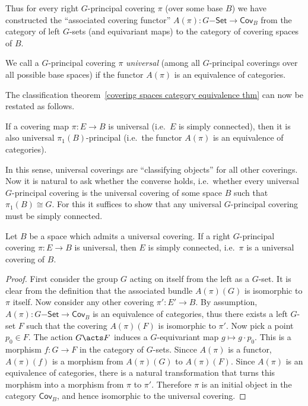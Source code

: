 Thus for every right $G$-principal covering $\pi$ (over some base $B$) we have constructed the ``associated covering functor'' $A(\pi):G\mathsf{-Set}\to \mathsf{Cov}_B$ from the category of left $G$-sets (and equivariant maps) to the category of covering spaces of $B$. 

\begin{defn}
    We call a $G$-principal covering $\pi$ \textit{universal} (among all $G$-principal coverings over all possible base spaces) if the functor $A(\pi)$ is an equivalence of categories.
\end{defn}

The classification theorem~\ref{covering spaces category equivalence thm} can now be restated as follows.
\begin{thm}
     If a covering map $\pi:E\to B$ is universal (i.e.\ $E$ is simply connected), then it is also universal $\pi_1(B)$-principal (i.e.\ the functor $A(\pi)$ is an equivalence of categories).
\end{thm}

In this sense, universal coverings are ``classifying objects'' for all other coverings. Now it is natural to ask whether the converse holds, i.e.\ whether every universal $G$-principal covering is the universal covering of some space $B$ such that $\pi_1(B)\cong G$. For this it suffices to show that any universal $G$-principal covering must be simply connected.

\begin{prop}
    Let $B$ be a space which admits a universal covering. If a right $G$-principal covering  $\pi:E\to B$ is universal, then $E$ is simply connected, i.e.\ $\pi$ is a universal covering of $B$.
\end{prop}
\begin{proof}
    First consider the group $G$ acting on itself from the left as a $G$-set. It is clear from the definition that the associated bundle $A(\pi)(G)$ is isomorphic to $\pi$ itself. Now consider any other covering $\pi':E'\to B$. By assumption, $A(\pi):G\mathsf{-Set}\to \mathsf{Cov}_B$ is an equivalence of categories, thus there exists a left $G$-set $F$ such that the covering $A(\pi)(F)$ is isomorphic to $\pi'$. Now pick a point $p_0\in F$. The action $G\acts F$ induces a $G$-equivariant map $g\mapsto g\cdot p_0$. This is a morphism $f:G\to F$ in the category of $G$-sets. Sincce $A(\pi)$ is a functor, $A(\pi)(f)$ is a morphism from $A(\pi)(G)$ to $A(\pi)(F)$. Since $A(\pi)$ is an equivalence of categories, there is a natural transformation that turns this morphism into a morphism from $\pi$ to $\pi'$. Therefore $\pi$ is an initial object in the category $\mathsf{Cov}_B$, and hence isomorphic to the universal covering.
\end{proof}

